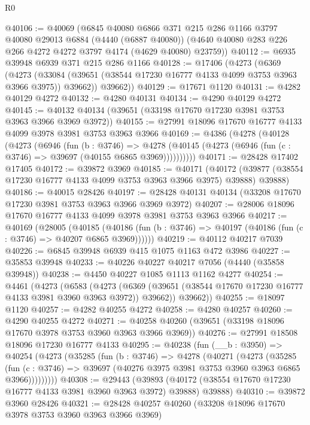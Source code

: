 \begin{lexlean}{R0}
\begin{coremodule}
@40106 := @40069
    (@6845
      @40080
      @6866
      @371
      @215
      @286
      @1166
      @3797
      @40080
      @29013
      @6884
      (@4440 (@6887 @40080))
      (@4640 @40080 @283 @226 @266 @4272 @4272 @3797 @4174 (@4629 @40080) @23759))
@40112 := @6935 @39948 @6939 @371 @215 @286 @1166
@40128 := @17406
    (@4273
      (@6369
        (@4273 (@33084 (@39651 (@38544 @17230 @16777 @4133 @4099 @3753 @3963 @3966 @3975)) @39662))
        @39662))
@40129 := @17671 @1120
@40131 := @4282 @40129 @4272
@40132 := @4280 @40131
@40134 := @4290 @40129 @4272
@40145 := @40132 @40134 (@39651 (@33198 @17670 @17230 @3981 @3753 @3963 @3966 @3969 @3972))
@40155 := @27991 @18096 @17670 @16777 @4133 @4099 @3978 @3981 @3753 @3963 @3966
@40169 := @4386
    (@4278
      (@40128
        (@4273
          (@6946
            (fun (b : @3746) =>
            @4278 (@40145 (@4273 (@6946 (fun (c : @3746) => @39697 (@40155 @6865 @3969))))))))))
@40171 := @28428 @17402 @17405
@40172 := @39872 @3969
@40185 := @40171
    (@40172 (@39877 (@38554 @17230 @16777 @4133 @4099 @3753 @3963 @3966 @3975) @39888) @39888)
@40186 := @40015 @28426
@40197 := @28428 @40131 @40134 (@33208 @17670 @17230 @3981 @3753 @3963 @3966 @3969 @3972)
@40207 := @28006 @18096 @17670 @16777 @4133 @4099 @3978 @3981 @3753 @3963 @3966
@40217 := @40169
    (@28005
      (@40185
        (@40186 (fun (b : @3746) => @40197 (@40186 (fun (c : @3746) => @40207 @6865 @3969))))))
@40219 := @40112 @40217 @7039
@40226 := @6845 @39948 @6939 @415 @1075 @1163 @472 @3986
@40227 := @35853 @39948
@40233 := @40226 @40227 @40217 @7056 (@4440 (@35858 @39948))
@40238 := @4450 @40227 @1085 @1113 @1162 @4277
@40254 := @4461
    (@4273
      (@6583
        (@4273 (@6369 (@39651 (@38544 @17670 @17230 @16777 @4133 @3981 @3960 @3963 @3972)) @39662))
        @39662))
@40255 := @18097 @1120
@40257 := @4282 @40255 @4272
@40258 := @4280 @40257
@40260 := @4290 @40255 @4272
@40271 := @40258 @40260 (@39651 (@33198 @18096 @17670 @3978 @3753 @3960 @3963 @3966 @3969))
@40276 := @27991 @18508 @18096 @17230 @16777 @4133
@40295 := @40238
    (fun (__b : @3950) =>
    @40254
      (@4273
        (@35285
          (fun (b : @3746) =>
          @4278
            (@40271
              (@4273
                (@35285
                  (fun (c : @3746) =>
                  @39697 (@40276 @3975 @3981 @3753 @3960 @3963 @6865 @3966)))))))))
@40308 := @29443
    (@39893 (@40172 (@38554 @17670 @17230 @16777 @4133 @3981 @3960 @3963 @3972) @39888) @39888)
@40310 := @39872 @3960 @28426
@40321 := @28428 @40257 @40260 (@33208 @18096 @17670 @3978 @3753 @3960 @3963 @3966 @3969)

\end{coremodule}
\end{lexlean}
